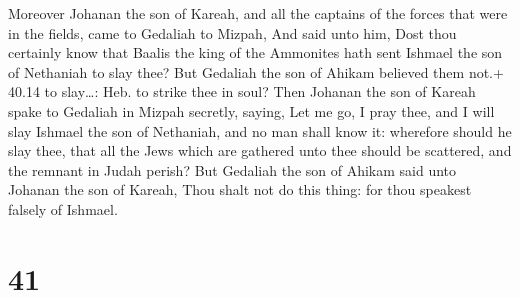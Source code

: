  Moreover Johanan the son of Kareah, and all the captains
of the forces that were in the fields, came to Gedaliah to Mizpah,
 And said unto him, Dost thou certainly know that Baalis
the king of the Ammonites hath sent Ishmael the son of Nethaniah to slay
thee? But Gedaliah the son of Ahikam believed them not.+ 40.14 to
slay\ldots: Heb. to strike thee in soul?  Then Johanan the
son of Kareah spake to Gedaliah in Mizpah secretly, saying, Let me go, I
pray thee, and I will slay Ishmael the son of Nethaniah, and no man
shall know it: wherefore should he slay thee, that all the Jews which
are gathered unto thee should be scattered, and the remnant in Judah
perish?  But Gedaliah the son of Ahikam said unto Johanan
the son of Kareah, Thou shalt not do this thing: for thou speakest
falsely of Ishmael.

\hypertarget{section-40}{%
\section{41}\label{section-40}}

